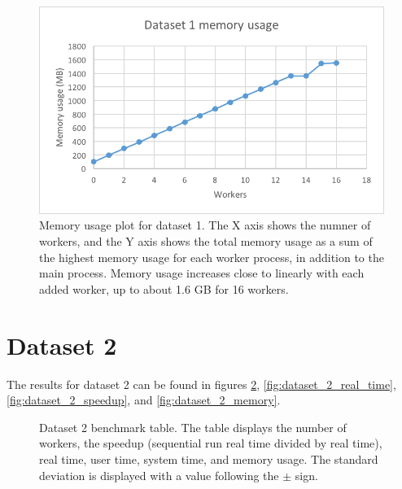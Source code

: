 \begin{figure}[ht]
  \centering
  \includegraphics[width=120mm]{figures/dataset_1/dataset_1_memory.png}
  \caption[Memory usage plot for dataset 1.]{Memory usage plot for dataset 1. The X axis shows the numner of workers, and the Y axis shows the total memory usage as
  a sum of the highest memory usage for each worker process, in addition to the main process. Memory usage increases close to linearly with each added worker,
  up to about 1.6 GB for 16 workers.}
  \label{fig:dataset_1_memory}
\end{figure}

\section{Dataset 2}
The results for dataset 2 can be found in figures \ref{fig:dataset_2_table}, \ref{fig:dataset_2_real_time}, \ref{fig:dataset_2_speedup}, and \ref{fig:dataset_2_memory}.

\begin{figure}[ht]
\centering
{}
\caption[Dataset 2 benchmark table.]{Dataset 2 benchmark table. The table displays the number of workers, the speedup (sequential run real time divided by real time), real time,
user time, system time, and memory usage. The standard deviation is displayed with a value following the $\pm$ sign.}
\label{fig:dataset_2_table}
\end{figure}

